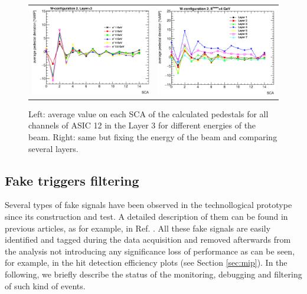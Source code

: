 \documentclass[a4paper,11pt]{article}
\begin{document}
\begin{figure}[!t]
  \centering 
    \begin{tabular}{ll}
      \includegraphics[width=2.8in]{figs/pedestal/pedestal_deviation_layer3.eps} & \includegraphics[width=2.8in]{figs/pedestal/pedestal_deviation_4GeV.eps} \\
    \end{tabular}
    \caption{Left: average value on each SCA of the calculated pedestals for all channels of ASIC 12 in the Layer 3 for different energies of the beam. Right: same but fixing the energy of the beam and comparing several layers.}
\label{pedestal_shower_2}
\end{figure}


\subsection{Fake triggers filtering}
\label{sec:retriggers}

Several types of fake signals have been observed in the technollogical prototype since its construction and test. A detailed description of them
can be found in previous articles, as for example, in Ref. \cite{Amjad:2014tha}. All these fake signals are easily identified
and tagged during the data acquisition and removed afterwards from the analysis
not introducing any significance loss of performance as can be seen, for example, in the hit detection efficiency plots (see Section \ref{sec:mip}).
In the following, we briefly describe the status of the monitoring, debugging and filtering
of such kind of events.
\end{document}
